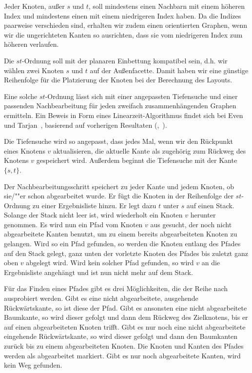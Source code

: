 \documentclass[a4paper]{scrreprt}
\theoremstyle{definition}
\begin{document}
Jeder Knoten, außer $s$ und $t$, soll mindestens einen Nachbarn mit einem höheren Index und mindestens einen mit einem niedrigeren Index haben. Da die Indizes paarweise verschieden sind, erhalten wir zudem einen orientierten Graphen, wenn wir die ungerichteten Kanten so ausrichten, dass sie vom niedrigeren Index zum höheren verlaufen.

Die $st$-Ordnung soll mit der planaren Einbettung kompatibel sein, d.h. wir wählen zwei Knoten $s$ und $t$ auf der Außenfacette. Damit haben wir eine günstige Reihenfolge für die Platzierung der Knoten bei der Berechnung des Layouts. 

Eine solche $st$-Ordnung lässt sich mit einer angepassten Tiefensuche und einer passenden Nachbearbeitung für jeden zweifach zusammenhängenden Graphen ermitteln. Ein Beweis in Form eines Linearzeit-Algorithmus findet sich bei Even und Tarjan~\cite{even+tarjan-75}, basierend auf vorherigen Resultaten (\cite{hopcroft+tarjan-74},~\cite{tarjan-72}).

Die Tiefensuche wird so angepasst, dass jedes Mal, wenn wir den Rückpunkt eines Knotens $v$ aktualisieren, die aktuelle Kante als zugehörig zum Rückweg des Knotens $v$ gespeichert wird. Außerdem beginnt die Tiefensuche mit der Kante $\{s, t\}$.

Der Nachbearbeitungsschritt speichert zu jeder Kante und jedem Knoten, ob sie/""er schon abgearbeitet wurde. Er fügt die Knoten in der Reihenfolge der $st$-Ordnung zu einer Ergebnisliste hinzu. Er legt dazu $t$ unter $s$ auf einen Stack. Solange der Stack nicht leer ist, wird wiederholt ein Knoten $v$ herunter genommen. Es wird nun ein Pfad vom Knoten $v$ aus gesucht, der noch nicht abgearbeitete Kanten benutzt, um zu einem bereits abgearbeiteten Knoten zu gelangen. Wird so ein Pfad gefunden, so werden die Knoten entlang des Pfades auf den Stack gelegt, ganz unten der vorletzte Knoten des Pfades bis zuletzt ganz oben $v$ abgelegt wird. Wird kein solcher Pfad gefunden, so wird $v$ an die Ergebnisliste angehängt und ist nun nicht mehr auf dem Stack.

Für das Finden eines Pfades gibt es drei Möglichkeiten, die der Reihe nach ausprobiert werden. Gibt es eine nicht abgearbeitete, ausgehende Rückwärtskante, so ist diese der Pfad. Gibt es ansonsten eine nicht abgearbeitete Baumkante, so wird dieser gefolgt und dann dem Rückweg des Zielknotens, bis er auf einen abgearbeiteten Knoten trifft. Gibt es nur noch eine nicht abgearbeitete eingehende Rückwärtskante, so wird dieser gefolgt und dann den Baumkanten zurück bis zu einem abgearbeiteten Knoten. Die Knoten und Kanten des Pfades werden als abgearbeitet markiert. Gibt es nur noch abgearbeitete Kanten, wird kein Weg gefunden.
\end{document}
